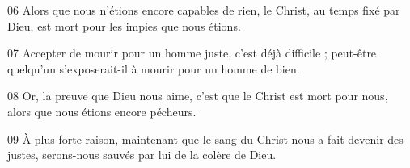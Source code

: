 
06 Alors que nous n’étions encore capables de rien, le Christ, au temps fixé par Dieu, est mort pour les impies que nous étions.

07 Accepter de mourir pour un homme juste, c’est déjà difficile ; peut-être quelqu’un s’exposerait-il à mourir pour un homme de bien.

08 Or, la preuve que Dieu nous aime, c’est que le Christ est mort pour nous, alors que nous étions encore pécheurs.

09 À plus forte raison, maintenant que le sang du Christ nous a fait devenir des justes, serons-nous sauvés par lui de la colère de Dieu.
